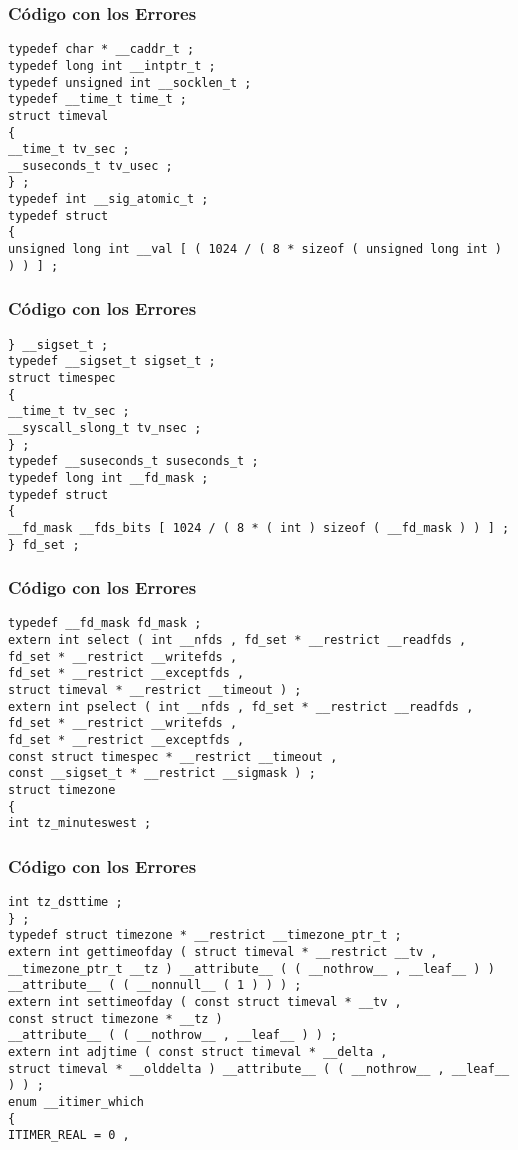 \documentclass{beamer}
\begin{document}
\begin{frame}[fragile]
\frametitle{C\'odigo con los Errores}
\begin{verbatim}
typedef char * __caddr_t ; 
typedef long int __intptr_t ; 
typedef unsigned int __socklen_t ; 
typedef __time_t time_t ; 
struct timeval 
{ 
__time_t tv_sec ; 
__suseconds_t tv_usec ; 
} ; 
typedef int __sig_atomic_t ; 
typedef struct 
{ 
unsigned long int __val [ ( 1024 / ( 8 * sizeof ( unsigned long int ) ) ) ] ; 
\end{verbatim}
\end{frame}
\begin{frame}[fragile]
\frametitle{C\'odigo con los Errores}
\begin{verbatim}
} __sigset_t ; 
typedef __sigset_t sigset_t ; 
struct timespec 
{ 
__time_t tv_sec ; 
__syscall_slong_t tv_nsec ; 
} ; 
typedef __suseconds_t suseconds_t ; 
typedef long int __fd_mask ; 
typedef struct 
{ 
__fd_mask __fds_bits [ 1024 / ( 8 * ( int ) sizeof ( __fd_mask ) ) ] ; 
} fd_set ; 
\end{verbatim}
\end{frame}
\begin{frame}[fragile]
\frametitle{C\'odigo con los Errores}
\begin{verbatim}
typedef __fd_mask fd_mask ; 
extern int select ( int __nfds , fd_set * __restrict __readfds , 
fd_set * __restrict __writefds , 
fd_set * __restrict __exceptfds , 
struct timeval * __restrict __timeout ) ; 
extern int pselect ( int __nfds , fd_set * __restrict __readfds , 
fd_set * __restrict __writefds , 
fd_set * __restrict __exceptfds , 
const struct timespec * __restrict __timeout , 
const __sigset_t * __restrict __sigmask ) ; 
struct timezone 
{ 
int tz_minuteswest ; 
\end{verbatim}
\end{frame}
\begin{frame}[fragile]
\frametitle{C\'odigo con los Errores}
\begin{verbatim}
int tz_dsttime ; 
} ; 
typedef struct timezone * __restrict __timezone_ptr_t ; 
extern int gettimeofday ( struct timeval * __restrict __tv , 
__timezone_ptr_t __tz ) __attribute__ ( ( __nothrow__ , __leaf__ ) ) __attribute__ ( ( __nonnull__ ( 1 ) ) ) ; 
extern int settimeofday ( const struct timeval * __tv , 
const struct timezone * __tz ) 
__attribute__ ( ( __nothrow__ , __leaf__ ) ) ; 
extern int adjtime ( const struct timeval * __delta , 
struct timeval * __olddelta ) __attribute__ ( ( __nothrow__ , __leaf__ ) ) ; 
enum __itimer_which 
{ 
ITIMER_REAL = 0 , 
\end{verbatim}
\end{frame}
\end{document}
